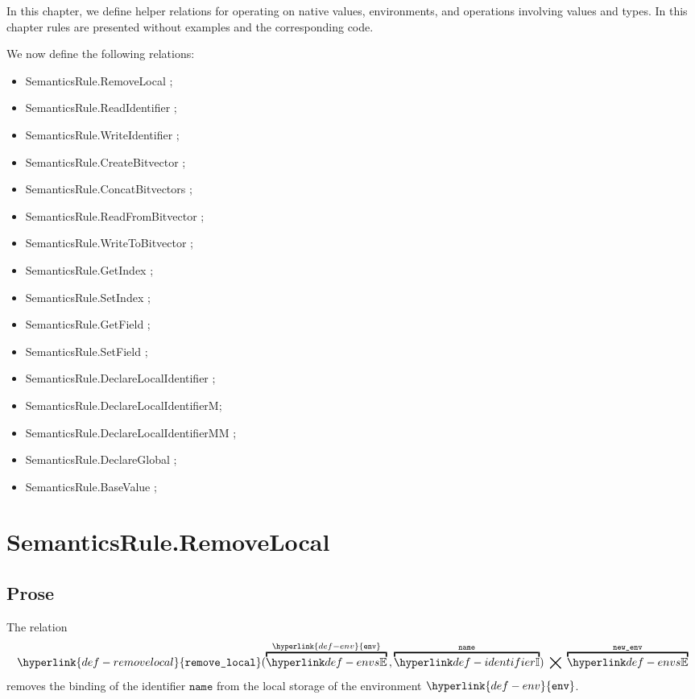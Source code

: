 \documentclass{book}
\newcommand\removelocal[0]{\hyperlink{def-removelocal}{\texttt{remove\_local}}}
\newcommand\env[0]{\hyperlink{def-env}{\texttt{env}}}
\newcommand\name[0]{\texttt{name}}
\begin{document}
In this chapter, we define helper relations for operating on native values,
environments, and operations involving values and types.
%
In this chapter rules are presented without examples and the corresponding code.

We now define the following relations:
\begin{itemize}
  \item SemanticsRule.RemoveLocal ;
  \item SemanticsRule.ReadIdentifier ;
  \item SemanticsRule.WriteIdentifier ;
  \item SemanticsRule.CreateBitvector ;
  \item SemanticsRule.ConcatBitvectors ;
  \item SemanticsRule.ReadFromBitvector ;
  \item SemanticsRule.WriteToBitvector ;
  \item SemanticsRule.GetIndex ;
  \item SemanticsRule.SetIndex ;
  \item SemanticsRule.GetField ;
  \item SemanticsRule.SetField ;
  \item SemanticsRule.DeclareLocalIdentifier ;
  \item SemanticsRule.DeclareLocalIdentifierM;
  \item SemanticsRule.DeclareLocalIdentifierMM ;
  \item SemanticsRule.DeclareGlobal ;
  \item SemanticsRule.BaseValue ;
\end{itemize}

\section{SemanticsRule.RemoveLocal \label{sec:SemanticsRule.RemoveLocal}}
\subsection{Prose}
The relation
\hypertarget{def-removelocal}{}
\[
  \removelocal(\overname{\envs}{\env} \aslsep \overname{\Identifiers}{\name}) \;\aslrel\; \overname{\envs}{\newenv}
\]
removes the binding of the identifier $\name$ from the local storage of the environment $\env$.
\end{document}
